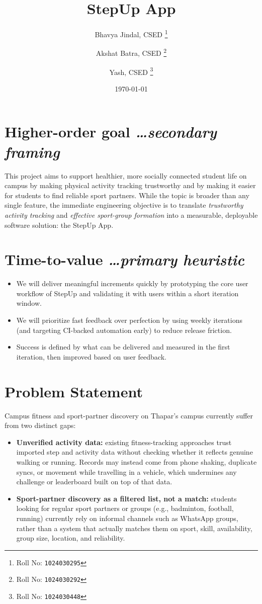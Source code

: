 \documentclass[11pt,a4paper]{article}
\title{StepUp App}
\author{
  Bhavya Jindal, CSED%
  \thanks{Roll No: \texttt{1024030295}}
  \and
  Akshat Batra, CSED%
  \thanks{Roll No: \texttt{1024030292}}
  \and
  Yash, CSED%
  \thanks{Roll No: \texttt{1024030448}}
}
\date{\today}
\newcommand{\BvrHint}[1]{%
  {\normalfont\normalsize\itshape\hfill #1}}
\begin{document}
\maketitle

\section{Higher-order goal%
  \BvrHint{\ldots secondary framing}}
This project aims to support healthier, more socially connected student
life on campus by making physical activity tracking trustworthy and by
making it easier for students to find reliable sport partners. While
the topic is broader than any single feature, the immediate engineering
objective is to translate \emph{trustworthy activity tracking} and
\emph{effective sport-group formation} into a measurable, deployable
software solution: the StepUp App.

\section{Time-to-value %
\BvrHint{\ldots primary heuristic}}
\begin{itemize}[leftmargin=0.7cm]
    \item We will deliver meaningful increments quickly by prototyping the core user workflow of StepUp and validating it with users within a short iteration window.
    \item We will prioritize fast feedback over perfection by using weekly iterations (and targeting CI-backed automation early) to reduce release friction.
    \item Success is defined by what can be delivered and measured in the first iteration, then improved based on user feedback.
\end{itemize}

\section{Problem Statement}
Campus fitness and sport-partner discovery on Thapar's campus currently
suffer from two distinct gaps:
\begin{itemize}[leftmargin=0.7cm]
    \item \textbf{Unverified activity data:} existing fitness-tracking approaches trust imported step and activity data without checking whether it reflects genuine walking or running. Records may instead come from phone shaking, duplicate syncs, or movement while travelling in a vehicle, which undermines any challenge or leaderboard built on top of that data.
    \item \textbf{Sport-partner discovery as a filtered list, not a match:} students looking for regular sport partners or groups (e.g., badminton, football, running) currently rely on informal channels such as WhatsApp groups, rather than a system that actually matches them on sport, skill, availability, group size, location, and reliability.
\end{itemize}
\end{document}

